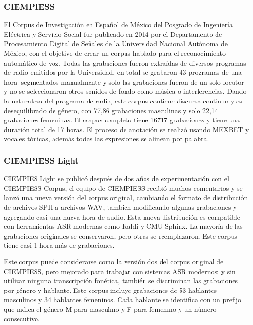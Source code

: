 \documentclass[a4paper,12pt,twoside]{report}
\begin{document}
\subsubsection{CIEMPIESS}

El Corpus de Investigación en Español de México del Posgrado de Ingeniería Eléctrica y Servicio Social fue publicado en 2014 por el Departamento de Procesamiento Digital de Señales de la Universidad Nacional Autónoma de México, con el objetivo de crear un corpus hablado para el reconocimiento automático de voz. Todas las grabaciones fueron extraídas de diversos programas de radio emitidos por la Universidad, en total se grabaron 43 programas de una hora, segmentados manualmente y solo las grabaciones fueron de un solo locutor y no se seleccionaron otros sonidos de fondo como música o interferencias. Dando la naturaleza del programa de radio, este corpus contiene discurso continuo y es desequilibrado de género, con 77,86 grabaciones masculinas y solo 22,14 grabaciones femeninas. El corpus completo tiene 16717 grabaciones y tiene una duración total de 17 horas. El proceso de anotación se realizó usando MEXBET y vocales tónicas, además todas las expresiones se alinean por palabra.

\subsubsection{CIEMPIESS Light}

CIEMPIES Light se publicó después de dos años de experimentación con el CIEMPIESS Corpus, el equipo de CIEMPIESS recibió muchos comentarios y se lanzó una nueva versión del corpus original, cambiando el formato de distribución de archivos SPH a archivos WAV, también modificando algunas grabaciones y agregando casi una nueva hora de audio. Esta nueva distribución es compatible con herramientas ASR modernas como Kaldi y CMU Sphinx. La mayoría de las grabaciones originales se conservaron, pero otras se reemplazaron. Este corpus tiene casi 1 hora más de grabaciones.

Este corpus puede considerarse como la versión dos del corpus original de CIEMPIESS, pero mejorado para trabajar con sistemas ASR modernos; y sin utilizar ninguna transcripción fonética, también se discriminan las grabaciones por género y hablante. Este corpus incluye grabaciones de 53 hablantes masculinos y 34 hablantes femeninos. Cada hablante se identifica con un prefijo que indica el género M para masculino y F para femenino y un número consecutivo.
\end{document}
